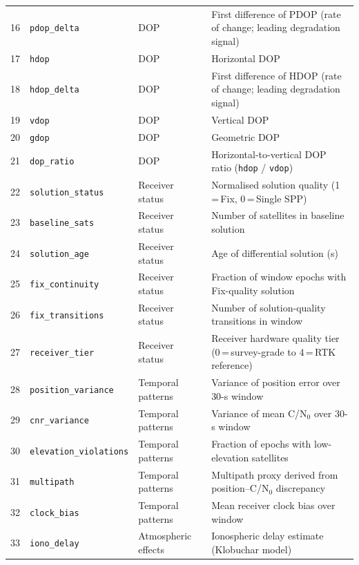 \documentclass[12pt,a4paper]{article}
\newcommand{\code}[1]{\texttt{#1}}
\begin{document}
\begin{longtable}{cllp{4.5cm}}
  16 & \code{pdop\_delta}           & DOP                   & First difference of PDOP (rate of change; leading degradation signal) \\
  17 & \code{hdop}                  & DOP                   & Horizontal DOP \\
  18 & \code{hdop\_delta}           & DOP                   & First difference of HDOP (rate of change; leading degradation signal) \\
  19 & \code{vdop}                  & DOP                   & Vertical DOP \\
  20 & \code{gdop}                  & DOP                   & Geometric DOP \\
  21 & \code{dop\_ratio}            & DOP                   & Horizontal-to-vertical DOP ratio (\code{hdop} / \code{vdop}) \\
  22 & \code{solution\_status}      & Receiver status       & Normalised solution quality (1\,=\,Fix, 0\,=\,Single SPP) \\
  23 & \code{baseline\_sats}        & Receiver status       & Number of satellites in baseline solution \\
  24 & \code{solution\_age}         & Receiver status       & Age of differential solution (s) \\
  25 & \code{fix\_continuity}       & Receiver status       & Fraction of window epochs with Fix-quality solution \\
  26 & \code{fix\_transitions}      & Receiver status       & Number of solution-quality transitions in window \\
  27 & \code{receiver\_tier}        & Receiver status       & Receiver hardware quality tier (0\,=\,survey-grade to 4\,=\,RTK reference) \\
  28 & \code{position\_variance}    & Temporal patterns     & Variance of position error over 30-s window \\
  29 & \code{cnr\_variance}         & Temporal patterns     & Variance of mean C/N$_0$ over 30-s window \\
  30 & \code{elevation\_violations} & Temporal patterns     & Fraction of epochs with low-elevation satellites \\
  31 & \code{multipath}             & Temporal patterns     & Multipath proxy derived from position--C/N$_0$ discrepancy \\
  32 & \code{clock\_bias}           & Temporal patterns     & Mean receiver clock bias over window \\
  33 & \code{iono\_delay}           & Atmospheric effects   & Ionospheric delay estimate (Klobuchar model) \\

\end{longtable}
\end{document}
